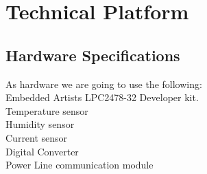 \section{Technical Platform}
\subsection{Hardware Specifications}
As hardware we are going to use the following: 
\\Embedded Artists LPC2478-32 Developer kit.
\\Temperature sensor
\\Humidity sensor
\\Current sensor
\\Digital Converter
\\Power Line communication module

